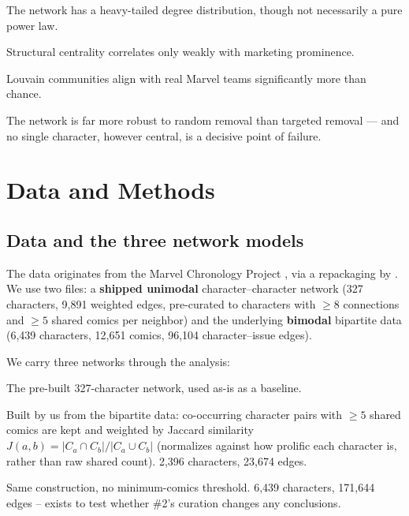 \documentclass[11pt]{article}
\begin{document}
\begin{description}[leftmargin=2em]
    \item[H1] The network has a heavy-tailed degree distribution, though not necessarily a pure power law.
    \item[H2] Structural centrality correlates only weakly with marketing prominence.
    \item[H3] Louvain communities align with real Marvel teams significantly more than chance.
    \item[H4] The network is far more robust to random removal than targeted removal — and no single character, however central, is a decisive point of failure.
\end{description}

\section{Data and Methods}

\subsection{Data and the three network models}
\label{sec:models}

The data originates from the Marvel Chronology Project \citep{chappell2001mcp}, via a repackaging by \citet{walsh2020marvel}. We use two files: a \textbf{shipped unimodal} character--character network (327 characters, 9{,}891 weighted edges, pre-curated to characters with $\geq 8$ connections and $\geq 5$ shared comics per neighbor) and the underlying \textbf{bimodal} bipartite data (6{,}439 characters, 12{,}651 comics, 96{,}104 character--issue edges). 

We carry three networks through the analysis:
\begin{description}[leftmargin=2em]
    \item[\#1 Shipped] The pre-built 327-character network, used as-is as a baseline.
    \item[\#2 Our Jaccard (curated)] Built by us from the bipartite data: co-occurring character pairs with $\geq 5$ shared comics are kept and weighted by Jaccard similarity $J(a,b) = |C_a \cap C_b| / |C_a \cup C_b|$ (normalizes against how prolific each character is, rather than raw shared count). 2{,}396 characters, 23{,}674 edges.
    \item[\#3 Our Jaccard (full)] Same construction, no minimum-comics threshold. 6{,}439 characters, 171{,}644 edges -- exists to test whether \#2's curation changes any conclusions.
\end{description}
\end{document}
